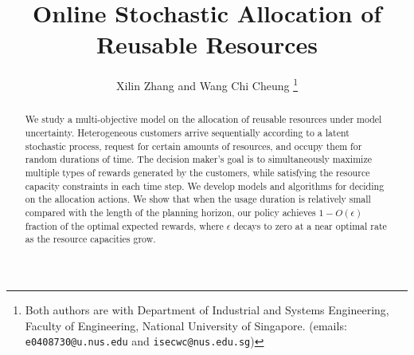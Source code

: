 \documentclass[letterpaper, 10 pt, conference]{ieeeconf}  %
\title{\LARGE \bf
Online Stochastic Allocation of Reusable Resources
}
\author{Xilin Zhang and Wang Chi Cheung%
\thanks{Both authors are with Department of Industrial and Systems Engineering, Faculty of Engineering, National University of Singapore. (emails: {\tt\small e0408730@u.nus.edu} and {\tt\small isecwc@nus.edu.sg})}%
}
\theoremstyle{plain}
\theoremstyle{definition}
\theoremstyle{remark}
\begin{document}
\maketitle
\thispagestyle{empty}
\pagestyle{empty}


\begin{abstract}

We study a multi-objective model on the allocation of reusable resources under model uncertainty. Heterogeneous customers arrive sequentially according to a latent stochastic process, request for certain amounts of resources, and occupy them for random durations of time. The decision maker's goal is to simultaneously maximize multiple types of rewards generated by the customers, while satisfying the resource capacity constraints in each time step. We develop models and algorithms for deciding on the allocation actions. We show that when the usage duration is relatively small compared with the length of the planning horizon, our policy achieves $1-O(\epsilon)$ fraction of the optimal expected rewards, where $\epsilon$ decays to zero at a near optimal rate as the resource capacities grow. 

\end{abstract}


\end{document}
